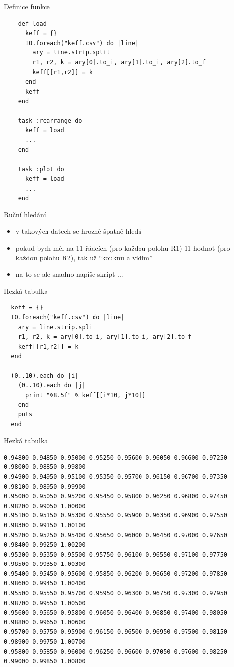 \documentclass{beamer}
\begin{document}
\begin{frame}[fragile]{Definice funkce}
  \scriptsize
  \begin{verbatim}
    def load
      keff = {}
      IO.foreach("keff.csv") do |line|
        ary = line.strip.split
        r1, r2, k = ary[0].to_i, ary[1].to_i, ary[2].to_f
        keff[[r1,r2]] = k
      end
      keff
    end

    task :rearrange do
      keff = load
      ...
    end

    task :plot do
      keff = load
      ...
    end
  \end{verbatim}
\end{frame}

\begin{frame}{Ruční hledání}
  \begin{itemize}
    \item v takových datech se hrozně špatně hledá
    \item pokud bych měl na 11 řádcích (pro každou polohu R1) 11 hodnot (pro každou polohu R2), tak už ``kouknu a vidím''
    \item na to se ale snadno napíše skript ...
  \end{itemize}
\end{frame}

\begin{frame}[fragile]{Hezká tabulka}
    \scriptsize
\begin{verbatim}
  keff = {}
  IO.foreach("keff.csv") do |line|
    ary = line.strip.split
    r1, r2, k = ary[0].to_i, ary[1].to_i, ary[2].to_f
    keff[[r1,r2]] = k
  end

  (0..10).each do |i|
    (0..10).each do |j|
      print "%8.5f" % keff[[i*10, j*10]]
    end
    puts
  end
\end{verbatim}
\end{frame}


\begin{frame}[fragile]{Hezká tabulka}
    \tiny
\begin{verbatim}
0.94800 0.94850 0.95000 0.95250 0.95600 0.96050 0.96600 0.97250 0.98000 0.98850 0.99800
0.94900 0.94950 0.95100 0.95350 0.95700 0.96150 0.96700 0.97350 0.98100 0.98950 0.99900
0.95000 0.95050 0.95200 0.95450 0.95800 0.96250 0.96800 0.97450 0.98200 0.99050 1.00000
0.95100 0.95150 0.95300 0.95550 0.95900 0.96350 0.96900 0.97550 0.98300 0.99150 1.00100
0.95200 0.95250 0.95400 0.95650 0.96000 0.96450 0.97000 0.97650 0.98400 0.99250 1.00200
0.95300 0.95350 0.95500 0.95750 0.96100 0.96550 0.97100 0.97750 0.98500 0.99350 1.00300
0.95400 0.95450 0.95600 0.95850 0.96200 0.96650 0.97200 0.97850 0.98600 0.99450 1.00400
0.95500 0.95550 0.95700 0.95950 0.96300 0.96750 0.97300 0.97950 0.98700 0.99550 1.00500
0.95600 0.95650 0.95800 0.96050 0.96400 0.96850 0.97400 0.98050 0.98800 0.99650 1.00600
0.95700 0.95750 0.95900 0.96150 0.96500 0.96950 0.97500 0.98150 0.98900 0.99750 1.00700
0.95800 0.95850 0.96000 0.96250 0.96600 0.97050 0.97600 0.98250 0.99000 0.99850 1.00800
\end{verbatim}
\end{frame}
\end{document}

